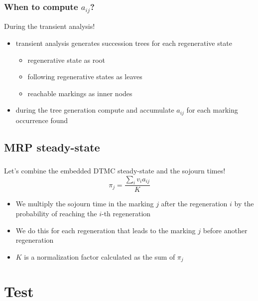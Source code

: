 \begin{frame}
  \frametitle{When to compute $a_{ij}$?}
  During the transient analysis!
  \begin{itemize}
  \item transient analysis generates succession trees for each
    regenerative state
    \begin{itemize}
    \item regenerative state as root
    \item following regenerative states as leaves
    \item reachable markings as inner nodes
    \end{itemize}
  \item during the tree generation compute and accumulate $a_{ij}$ for
    each marking occurrence found
  \end{itemize}
\end{frame}
\subsection{\acf{MRP} steady-state}
\begin{frame}
  \frametitle{\insertsubsection}
  Let's combine the embedded \acs{DTMC} steady-state and the sojourn
  times!
  \pause
  \begin{equation*}
    \pi_j = \frac{\sum_i v_i a_{ij}}{K}
  \end{equation*}
  \pause
  \begin{itemize}
  \item We multiply the sojourn time in the marking $j$ after the
    regeneration $i$ by the probability of reaching the $i$-th regeneration
    \pause
  \item We do this for each regeneration that leads to the marking $j$
    before another regeneration
    \pause
  \item $K$ is a normalization factor calculated as the sum of $\pi_j$
  \end{itemize}
\end{frame}
\section{Test}
\begin{frame}
  \frametitle{\insertsection}
  
\end{frame}
